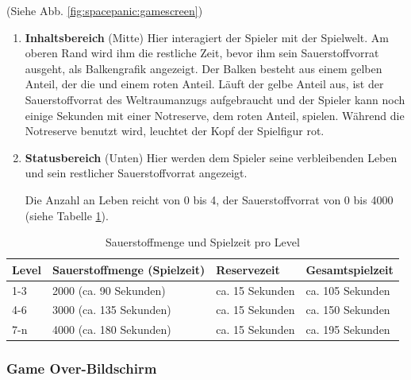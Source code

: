 \documentclass[12pt]{article}
\begin{document}
	(Siehe Abb. \ref{fig:spacepanic:gamescreen})
\begin{enumerate}
\item \textbf{Inhaltsbereich} (Mitte) \newline
Hier interagiert der Spieler mit der Spielwelt. Am oberen Rand wird ihm die restliche Zeit, bevor ihm sein Sauerstoffvorrat ausgeht, als Balkengrafik angezeigt. Der Balken besteht aus einem gelben Anteil, der die  und einem roten Anteil. Läuft der gelbe Anteil aus, ist der Sauerstoffvorrat des Weltraumanzugs aufgebraucht und der Spieler kann noch einige Sekunden mit einer Notreserve, dem roten Anteil, spielen. Während die Notreserve benutzt wird, leuchtet der Kopf der Spielfigur rot. 


\item \textbf{Statusbereich} (Unten) \newline
Hier werden dem Spieler seine verbleibenden Leben und sein restlicher Sauerstoffvorrat angezeigt.

Die Anzahl an Leben reicht von 0 bis 4, der Sauerstoffvorrat von 0 bis 4000 (siehe Tabelle \ref{table:oxygen-per-level}).
\end{enumerate}
    
\begin{table}[ht]
\centering
\begin{tabular}{llll}
\hline
\textbf{Level} & \textbf{Sauerstoffmenge (Spielzeit)} & \textbf{Reservezeit} & \textbf{Gesamtspielzeit} \\ \hline
1-3            & 2000 (ca. 90 Sekunden)               & ca. 15 Sekunden      & ca. 105 Sekunden                   \\
4-6            & 3000 (ca. 135 Sekunden)              & ca. 15 Sekunden      & ca. 150 Sekunden                   \\
7-n            & 4000 (ca. 180 Sekunden)              & ca. 15 Sekunden      & ca. 195 Sekunden                   \\ \hline
\end{tabular}
\caption{Sauerstoffmenge und Spielzeit pro Level}
\label{table:oxygen-per-level}
\end{table}
    
    
\subsubsection{Game Over-Bildschirm} \label{ssec:gameoverscreen}
\end{document}
